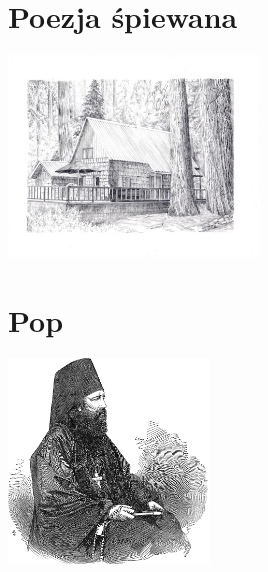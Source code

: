 \documentclass[11pt, twoside]{book}
\let\clearpage\relax
\begin{document}
\chapter{Poezja śpiewana}
\begin{center}
    \includegraphics[width=0.5\textwidth]{images/chatka.jpg}
\end{center}
\pagestyle{poezja}
\setcounter{section}{2}
\newpage\pagestyle{poezja}
\setcounter{section}{6}


\chapter{Pop}
\begin{center}
    \includegraphics[width=0.4\textwidth]{images/pop.png}
\end{center}
\pagestyle{pop}
\setcounter{section}{0}

\setcounter{section}{2}

\setcounter{section}{20}

\setcounter{section}{21}


\clearpage{\mbox{}\pagestyle{empty}\cleardoublepage}
\end{document}
